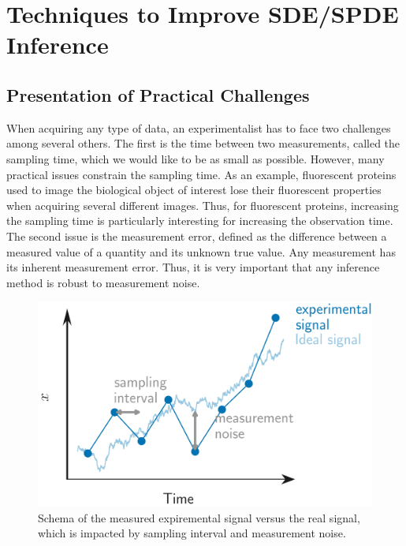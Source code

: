 \chapter{Techniques to Improve SDE/SPDE Inference}
\chaptertoc{}

\section{Presentation of Practical Challenges}

When acquiring any type of data, an experimentalist has to face two challenges among several others. The first is the time between two measurements, called the sampling time, which we would like to be as small as possible. However, many practical issues constrain the sampling time. As an example, fluorescent proteins used to image the biological object of interest lose their fluorescent properties when acquiring several different images. Thus, for fluorescent proteins, increasing the sampling time is particularly interesting for increasing the observation time. The second issue is the measurement error, defined as the difference between a measured value of a quantity and its unknown true value. Any measurement has its inherent measurement error. Thus, it is very important that any inference method is robust to measurement noise.

\begin{figure}
    \centering
    \includegraphics[width=0.5\linewidth]{fig/illustration_signal_2.png}
    \caption{Schema of the measured expiremental signal versus the real signal, which is impacted by sampling interval and measurement noise.}
    \label{fig:enter-label}
\end{figure}


